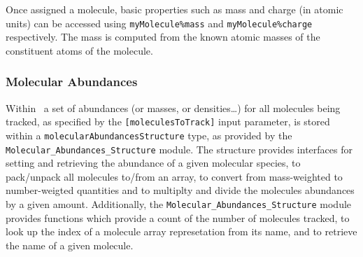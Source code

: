 Once assigned a molecule, basic properties such as mass and charge (in atomic units) can be accessed using {\tt myMolecule\%mass} and {\tt myMolecule\%charge} respectively. The mass is computed from the known atomic masses of the constituent atoms of the molecule.

\subsubsection{Molecular Abundances}

Within \glc\ a set of abundances (or masses, or densities\ldots) for all molecules being tracked, as specified by the {\tt [moleculesToTrack]} input parameter, is stored within a {\tt molecularAbundancesStructure} type, as provided by the {\tt Molecular\_Abundances\_Structure} module. The structure provides interfaces for setting and retrieving the abundance of a given molecular species, to pack/unpack all molecules to/from an array, to convert from mass-weighted to number-weigted quantities and to multiplty and divide the molecules abundances by a given amount. Additionally, the {\tt Molecular\_Abundances\_Structure} module provides functions which provide a count of the number of molecules tracked, to look up the index of a molecule array represetation from its name, and to retrieve the name of a given molecule.
